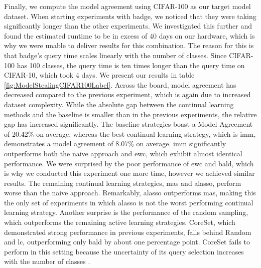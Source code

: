 Finally, we compute the model agreement using CIFAR-100 as our target model dataset. When starting experiments with \gls{badge}, we noticed that they were taking
significantly longer than the other experiments. We investigated this further and found the estimated runtime to be in excess of 40 days on our hardware, which is
why we were unable to deliver results for this combination. The reason for this is that \gls{badge}'s query time scales linearly with the number of classes. Since
CIFAR-100 has 100 classes, the query time is ten times longer than the query time on CIFAR-10, which took 4 days. We present our results in table 
\ref{fig:ModelStealingCIFAR100Label}. Across the board, model agreement has decreased compared to the previous experiment, which is again due to increased dataset
complexity. While the absolute gap between the continual learning methods and the baseline is smaller than in the previous experiments, the relative gap has increased
significantly. The baseline strategies boast a Model Agreement of 20.42\% on average, whereas the best continual learning strategy, which is \gls{imm}, demonstrates a
model agreement of 8.07\% on average. \gls{imm} significantly outperforms both the naive approach and \gls{ewc}, which exhibit almost identical performance. We were surprised
by the poor performance of \gls{ewc} and \gls{bald}, which is why we conducted this experiment one more time, however we achieved similar results. The remaining
continual learning strategies, \gls{mas} and \gls{alasso}, perform worse than the naive approach. Remarkably, \gls{alasso} outperforms \gls{mas}, making this the
only set of experiments in which \gls{alasso} is not the worst performing continual learning strategy. Another surprise is the performance of the random sampling,
which outperforms the remaining active learning strategies. CoreSet, which demonstrated strong performance in previous experiments, falls behind
Random and \gls{lc}, outperforming only \gls{bald} by about one percentage point. CoreSet fails to perform in this setting because the uncertainty of its query
selection increases with the number of classes \cite{sener2017active}. \par

